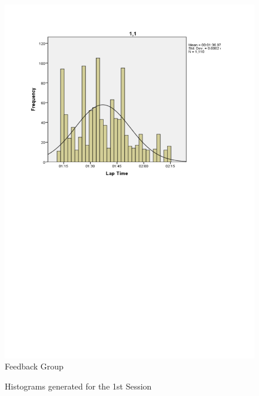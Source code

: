 \begin{figure}
\begin{minipage}{0.45\textwidth}
		\includegraphics[width=\textwidth]{charts/1-1}
		Feedback Group
	\end{minipage}
	\caption{Histograms generated for the 1st Session}
	\label{fig:hist-1}
\end{figure}

